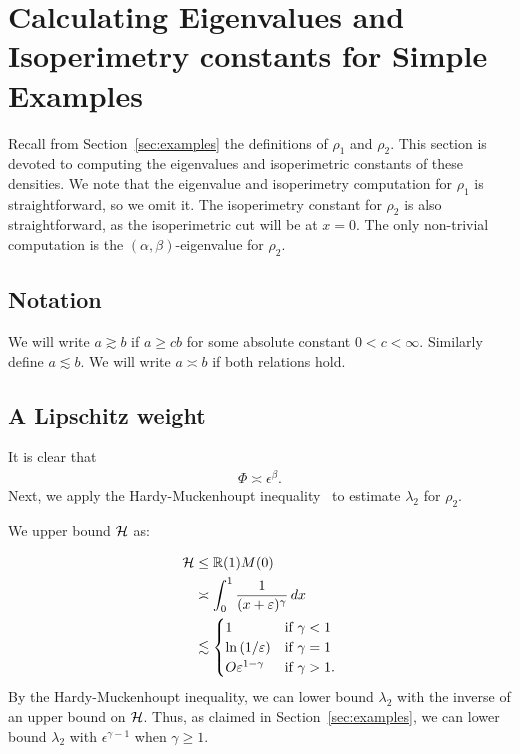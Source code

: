 \section{Calculating Eigenvalues and Isoperimetry constants for Simple
  Examples}\label{app:examples}
Recall from Section~\ref{sec:examples} the definitions of $\rho_1$ and
$\rho_2$. This section is devoted to computing the eigenvalues and
isoperimetric constants of these densities. We note that the eigenvalue
and isoperimetry computation for $\rho_1$ is straightforward, so we omit
it. The isoperimetry constant for $\rho_2$ is also straightforward, as
the isoperimetric cut will be at $x = 0$. The only non-trivial
computation is the $(\alpha,\beta)$-eigenvalue for $\rho_2$.

\subsection{Notation}
We will write $a\gtrsim b$ if $a\geq cb$ for some absolute constant $0<c<\infty$. Similarly define $a \lesssim b$. We will write $a\asymp b$ if both relations hold.

\subsection{A Lipschitz weight}
\label{subsec:lipschitz_example}

It is clear that
\begin{align*}
\Phi \asymp \epsilon^\beta.
\end{align*}
Next, we apply the Hardy-Muckenhoupt inequality~\cite{MillerHardy18} to estimate $\lambda_2$
for $\rho_2$. 

We upper bound $\mathcal{H}$ as:

\begin{align*}
\mathcal{H} &\leq{\mathbb R}(1)M(0)\\
  &\asymp  \int_0^1 \frac{1}{(x+\varepsilon)^{\gamma}}\,dx\\
& \lesssim \begin{cases}
  1 & \text{if } \gamma<1\\
  \ln\left(1/\varepsilon\right)& \text{if } \gamma = 1\\
  O\varepsilon^{1-\gamma}& \text{if } \gamma>1.
\end{cases}
\end{align*}
By the Hardy-Muckenhoupt inequality, we can lower bound $\lambda_2$ with
the inverse of an upper bound on $\mathcal{H}$. Thus, as claimed in
Section~\ref{sec:examples}, we can lower bound $\lambda_2$ with
$\epsilon^{\gamma - 1}$ when $\gamma \geq 1$.

